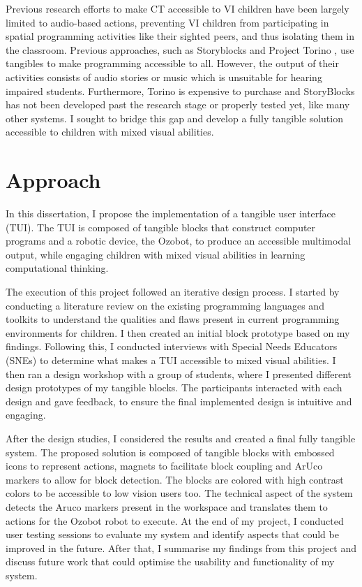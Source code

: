 \documentclass[oneside,%
                    author={Malak Hajji},
                    degree={BSc},
                    title={Designing An Accessible Computational Toolkit For Students},
                  subtitle={With Mixed Visual Abilities}]{dissertation}
\begin{document}
Previous research efforts to make CT accessible to VI children have been largely limited to audio-based actions, preventing VI children from participating in spatial programming activities like their sighted peers, and thus isolating them in the classroom. Previous approaches, such as Storyblocks\cite{storyblocks} and Project Torino\cite{torino} , use tangibles to make programming accessible to all. However, the output of their activities consists of audio stories or music  which is unsuitable for hearing impaired students.
Furthermore, Torino is expensive to purchase and StoryBlocks has not been developed past the research stage or properly tested yet, like many other systems. 
I sought to bridge this gap and develop a fully tangible solution accessible to children with mixed visual abilities.
\section{Approach}
In this dissertation, I propose the implementation of a tangible user interface (TUI). The TUI is composed of tangible blocks that construct computer programs and a robotic device, the Ozobot, to produce an accessible multimodal output, while engaging children with mixed visual abilities in learning computational thinking. 

The execution of this project followed an iterative design process. I started by conducting a literature review on the existing programming languages and toolkits to understand the qualities and flaws present in current programming environments for children. I then created an initial block prototype based on my findings. Following this, I conducted interviews with Special Needs Educators (SNEs) to determine what makes a TUI accessible to mixed visual abilities. I then ran a design workshop with a group of students, where I presented different design prototypes of my tangible blocks. The participants interacted with each design and gave feedback, to ensure the final implemented design is intuitive and engaging.

After the design studies, I considered the results and created a final fully tangible system. The proposed solution is composed of tangible blocks with embossed icons to represent actions, magnets to facilitate block coupling and ArUco markers to allow for block detection. The blocks are colored with high contrast colors to be accessible to low vision users too.
The technical aspect of the system detects the Aruco markers present in the  workspace and translates them to actions for the Ozobot robot to execute. 
At the end of my project, I conducted user testing sessions to evaluate my system and identify aspects that could be improved in the future. After that, I summarise my findings from this project and discuss future work that could optimise the usability and functionality of my system.
\end{document}
